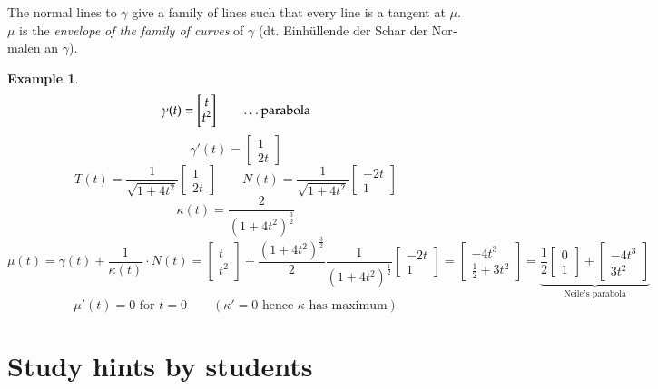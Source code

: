 \documentclass{article}
\newtheorem{example}{Example}  \numberwithin{example}{section}
\begin{document}
The normal lines to $\gamma$ give a family of lines such that every line is a tangent at $\mu$.
$\mu$ is the \emph{envelope of the family of curves} of $\gamma$ (dt. \foreignlanguage{german}{Einh\"ullende der Schar der Normalen an $\gamma$}).

\begin{example}
  \[ \gamma(t) = \begin{bmatrix} t \\ t^2 \end{bmatrix} \qquad \text{\dots parabola} \]
  \[ \gamma'(t) = \begin{bmatrix} 1 \\ 2t \end{bmatrix} \]
  \[ T(t) = \frac{1}{\sqrt{1 + 4t^2}} \begin{bmatrix} 1 \\ 2t \end{bmatrix} \qquad N(t) = \frac{1}{\sqrt{1 + 4t^2}} \begin{bmatrix} -2t \\ 1 \end{bmatrix} \]
  \[ \kappa(t) = \frac{2}{(1 + 4t^2)^{\frac32}} \]
  \[ \mu(t) = \gamma(t) + \frac{1}{\kappa(t)} \cdot N(t) = \begin{bmatrix} t \\ t^2 \end{bmatrix} + \frac{(1 + 4t^2)^{\frac32}}{2} \frac{1}{(1 + 4t^2)^{\frac12}} \begin{bmatrix} -2t \\ 1 \end{bmatrix} = \begin{bmatrix} -4t^3 \\ \frac12 + 3t^2 \end{bmatrix} = \underbrace{\frac12 \begin{bmatrix} 0 \\ 1 \end{bmatrix} + \begin{bmatrix} -4t^3 \\ 3t^2 \end{bmatrix}}_{\text{Neile's parabola}} \]
  \[ \mu'(t) = 0 \text{ for } t = 0 \qquad (\kappa' = 0 \text{ hence } \kappa \text{ has maximum}) \]
\end{example}

\section*{Study hints by students}
\end{document}
